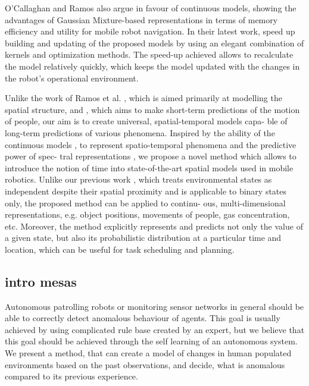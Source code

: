  O’Callaghan  and  Ramos  \cite{o2012gaussian}  also  argue  in  favour  of continuous  models,  showing  the  advantages  of  Gaussian Mixture-based representations in terms of memory efficiency and utility for mobile robot navigation.
 In their latest work, \cite{ramos2016hilbert} speed up building and updating of the proposed models by using an elegant combination of kernels and optimization methods.
  The  speed-up  achieved  allows  to  recalculate  the model  relatively  quickly,  which  keeps  the  model  updated with the changes in the robot’s operational environment.

 Unlike  the  work  of  Ramos  et  al. \cite{ramos2016hilbert},  which  is  aimed primarily at modelling the spatial structure, and \cite{kucner2017enabling}, which aims to make short-term predictions of the motion of people, our aim is to create universal, spatial-temporal models capa- ble of long-term predictions of various phenomena.
 Inspired by the ability of the continuous models \cite{ramos2016hilbert}, \cite{kucner2017enabling} to represent spatio-temporal phenomena and the predictive power of spec- tral  representations  \cite{krajnik2017fremen},  we  propose  a  novel  method  which allows  to  introduce  the  notion  of  time  into  state-of-the-art spatial models used in mobile robotics.
 Unlike our previous work  \cite{krajnik2017fremen},  which  treats  environmental  states  as  independent despite  their  spatial  proximity  and  is  applicable  to  binary states only, the proposed method can be applied to continu- ous, multi-dimensional representations, e.g. object positions, movements of people, gas concentration, etc.
 Moreover, the method explicitly represents and predicts not only the value of  a  given  state,  but  also  its  probabilistic  distribution  at  a particular  time  and  location,  which  can  be  useful  for  task scheduling and planning.

\subsection{intro mesas}


Autonomous patrolling robots or monitoring sensor networks in general should be able to correctly detect anomalous behaviour of agents.
This goal  is usually achieved by using complicated rule base created by an expert, but we believe that this goal should be achieved through the self learning of an autonomous system.
We present a method, that can create a model of changes in human populated environments based on the past observations, and decide, what is anomalous compared to its previous experience.

